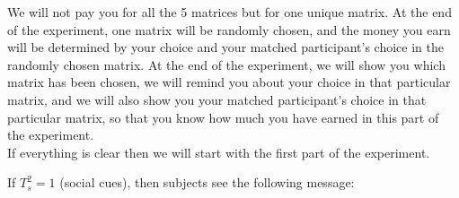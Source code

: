 \documentclass[11pt]{article}
\begin{document}
\begin{tcolorbox}
We will not pay you for all the 5 matrices but for one unique matrix. At the end of the experiment, one matrix will be randomly chosen, and the money you earn will be determined by your choice and your matched participant's choice in the randomly chosen matrix. At the end of the experiment, we will show you which matrix has been chosen, we will remind you about your choice in that particular matrix, and we will also show you your matched participant's choice in that particular matrix, so that you know how much you have earned in this part of the experiment.\\

If everything is clear then we will start with the first part of the experiment.
\end{tcolorbox}

If $T_s^2=1$ (social cues), then subjects see the following message:
\end{document}

